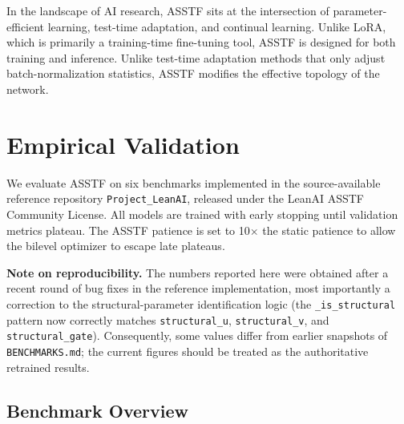 \documentclass[11pt,a4paper]{article}
\theoremstyle{definition}
\begin{document}
In the landscape of AI research, ASSTF sits at the intersection of parameter-efficient learning, test-time adaptation, and continual learning. Unlike LoRA, which is primarily a training-time fine-tuning tool, ASSTF is designed for both training and inference. Unlike test-time adaptation methods that only adjust batch-normalization statistics, ASSTF modifies the effective topology of the network.

\section{Empirical Validation}
\label{sec:empirical}

We evaluate ASSTF on six benchmarks implemented in the source-available reference repository \texttt{Project\_LeanAI}, released under the LeanAI ASSTF Community License. All models are trained with early stopping until validation metrics plateau. The ASSTF patience is set to 10$\times$ the static patience to allow the bilevel optimizer to escape late plateaus.

\textbf{Note on reproducibility.} The numbers reported here were obtained after a recent round of bug fixes in the reference implementation, most importantly a correction to the structural-parameter identification logic (the \texttt{\_is\_structural} pattern now correctly matches \texttt{structural\_u}, \texttt{structural\_v}, and \texttt{structural\_gate}). Consequently, some values differ from earlier snapshots of \texttt{BENCHMARKS.md}; the current figures should be treated as the authoritative retrained results.

\subsection{Benchmark Overview}
\label{subsec:benchmark_overview}
\end{document}
